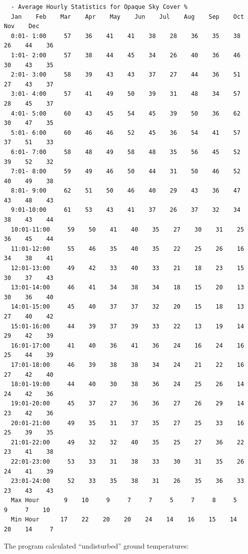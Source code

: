 \begin{lstlisting}
  - Average Hourly Statistics for Opaque Sky Cover %
  Jan    Feb    Mar    Apr    May    Jun    Jul    Aug    Sep    Oct    Nov    Dec   
  0:01- 1:00     57    36    41    41    38    28    36    35    38    26    44    36 
  1:01- 2:00     57    38    44    45    34    26    40    36    46    30    43    35 
  2:01- 3:00     58    39    43    43    37    27    44    36    51    27    43    37 
  3:01- 4:00     57    41    49    50    39    31    48    34    57    28    45    37 
  4:01- 5:00     60    43    45    54    45    39    50    36    62    30    47    35 
  5:01- 6:00     60    46    46    52    45    36    54    41    57    37    51    33 
  6:01- 7:00     58    48    49    58    48    35    56    45    52    39    52    32 
  7:01- 8:00     59    49    46    50    44    31    50    46    52    40    49    38 
  8:01- 9:00     62    51    50    46    40    29    43    36    47    43    48    43 
  9:01-10:00     61    53    43    41    37    26    37    32    34    38    43    44 
  10:01-11:00     59    50    41    40    35    27    30    31    25    36    45    44 
  11:01-12:00     55    46    35    40    35    22    25    26    16    34    38    41 
  12:01-13:00     49    42    33    40    33    21    18    23    15    30    37    43 
  13:01-14:00     46    41    34    38    34    18    15    20    13    30    36    40 
  14:01-15:00     45    40    37    37    32    20    15    18    13    27    40    42 
  15:01-16:00     44    39    37    39    33    22    13    19    14    29    42    39 
  16:01-17:00     41    40    36    41    36    24    16    24    16    25    44    39 
  17:01-18:00     46    39    38    38    34    24    21    22    16    27    42    40 
  18:01-19:00     44    40    30    38    36    24    25    26    14    24    42    36 
  19:01-20:00     45    37    27    36    36    27    26    29    14    23    42    36 
  20:01-21:00     49    35    31    37    35    27    25    33    16    25    39    35 
  21:01-22:00     49    32    32    40    35    25    27    36    22    23    41    38 
  22:01-23:00     53    33    31    38    33    30    31    35    26    24    41    39 
  23:01-24:00     52    33    35    38    31    26    35    36    33    23    43    43 
  Max Hour       9    10     9     7     7     5     7     8     5     9     7    10  
  Min Hour      17    22    20    20    24    14    16    15    14    20    14     7
\end{lstlisting}

The program calculated ``undisturbed'' ground temperatures:

